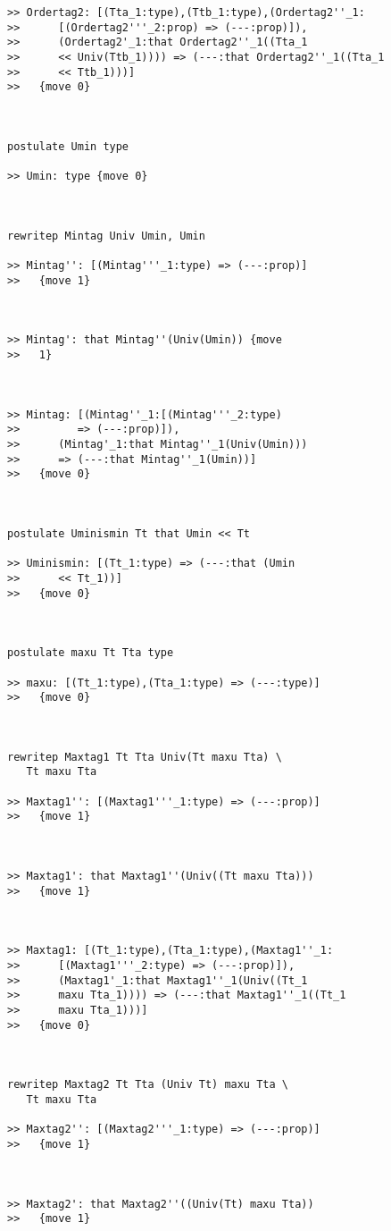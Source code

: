 \documentclass{article}
\begin{document}
\begin{verbatim}
>> Ordertag2: [(Tta_1:type),(Ttb_1:type),(Ordertag2''_1:
>>      [(Ordertag2'''_2:prop) => (---:prop)]),
>>      (Ordertag2'_1:that Ordertag2''_1((Tta_1
>>      << Univ(Ttb_1)))) => (---:that Ordertag2''_1((Tta_1
>>      << Ttb_1)))]
>>   {move 0}



postulate Umin type

>> Umin: type {move 0}



rewritep Mintag Univ Umin, Umin

>> Mintag'': [(Mintag'''_1:type) => (---:prop)]
>>   {move 1}



>> Mintag': that Mintag''(Univ(Umin)) {move
>>   1}



>> Mintag: [(Mintag''_1:[(Mintag'''_2:type)
>>         => (---:prop)]),
>>      (Mintag'_1:that Mintag''_1(Univ(Umin)))
>>      => (---:that Mintag''_1(Umin))]
>>   {move 0}



postulate Uminismin Tt that Umin << Tt

>> Uminismin: [(Tt_1:type) => (---:that (Umin
>>      << Tt_1))]
>>   {move 0}



postulate maxu Tt Tta type

>> maxu: [(Tt_1:type),(Tta_1:type) => (---:type)]
>>   {move 0}



rewritep Maxtag1 Tt Tta Univ(Tt maxu Tta) \
   Tt maxu Tta

>> Maxtag1'': [(Maxtag1'''_1:type) => (---:prop)]
>>   {move 1}



>> Maxtag1': that Maxtag1''(Univ((Tt maxu Tta)))
>>   {move 1}



>> Maxtag1: [(Tt_1:type),(Tta_1:type),(Maxtag1''_1:
>>      [(Maxtag1'''_2:type) => (---:prop)]),
>>      (Maxtag1'_1:that Maxtag1''_1(Univ((Tt_1
>>      maxu Tta_1)))) => (---:that Maxtag1''_1((Tt_1
>>      maxu Tta_1)))]
>>   {move 0}



rewritep Maxtag2 Tt Tta (Univ Tt) maxu Tta \
   Tt maxu Tta

>> Maxtag2'': [(Maxtag2'''_1:type) => (---:prop)]
>>   {move 1}



>> Maxtag2': that Maxtag2''((Univ(Tt) maxu Tta))
>>   {move 1}




\end{verbatim}
\end{document}
